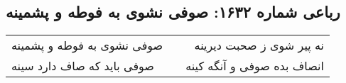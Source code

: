 \begin{center}
\section*{رباعی شماره ۱۶۳۲: صوفی نشوی به فوطه و پشمینه}
\label{sec:1632}
\begin{longtable}{l p{0.5cm} r}
صوفی نشوی به فوطه و پشمینه
&&
نه پیر شوی ز صحبت دیرینه
\\
صوفی باید که صاف دارد سینه
&&
انصاف بده صوفی و آنگه کینه
\\
\end{longtable}
\end{center}
